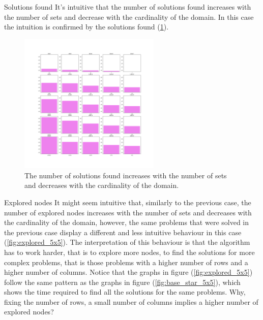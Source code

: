 \documentclass{beamer}
\begin{document}
\begin{frame}{Solutions found}
    It's intuitive that the number of solutions found increases
    with the number of sets and decrease with the cardinality of the domain.
    In this case the intuition is confirmed by the solutions found (\ref{fig:sol_5x5}).
\end{frame}

\begin{frame}
    \begin{figure}
        \centering
        \includegraphics[width=0.6\textwidth]{sol_5x5.pdf}
        \caption{The number of solutions found increases with the number of sets 
        and decreases with the cardinality of the domain.}
        \label{fig:sol_5x5}
    \end{figure}
\end{frame}

\begin{frame}{Explored nodes}
    It might seem intuitive that, similarly to the previous case, the number of explored nodes
    increases with the number of sets and decreases with the cardinality of the domain,
    however, the same problems that were solved in the previous case display a different
    and less intuitive behaviour in this case (\ref{fig:explored_5x5}).
    The interpretation of this behaviour is that the algorithm has to work harder,
    that is to explore more nodes, to find the solutions for more complex problems, that
    is those problems with a higher number of rows and a higher number of columns.
    Notice that the graphs in figure (\ref{fig:explored_5x5}) follow the same pattern
    as the graphs in figure (\ref{fig:base_star_5x5}), which shows the time required to find all
    the solutions for the same problems.
    Why, fixing the number of rows, a small number of columns implies a higher
    number of explored nodes? 
\end{frame}    
\end{document}
